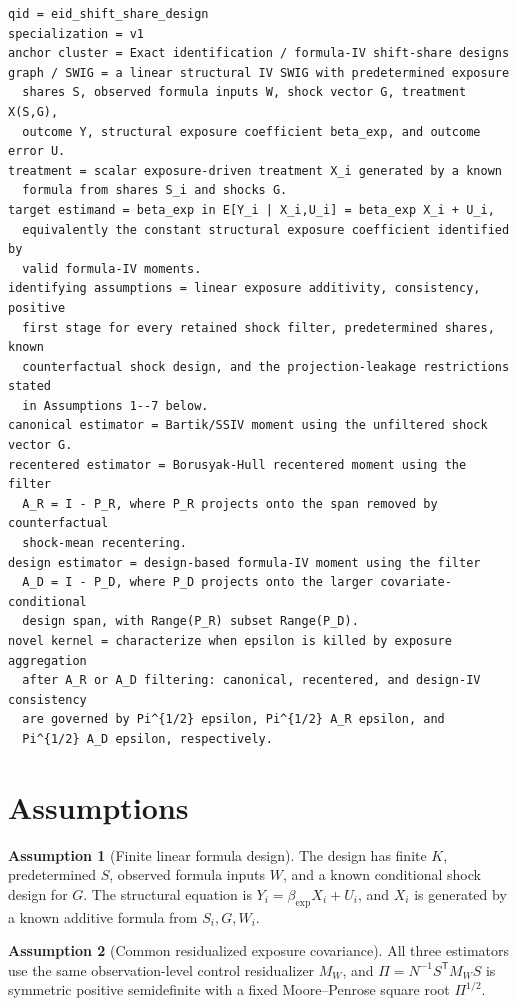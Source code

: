 \documentclass[11pt]{article}
\newcommand{\transpose}{\mathsf{T}}
\theoremstyle{definition}
\newtheorem{assumption}{Assumption}
\theoremstyle{plain}
\theoremstyle{remark}
\begin{document}
\begin{verbatim}
qid = eid_shift_share_design
specialization = v1
anchor cluster = Exact identification / formula-IV shift-share designs
graph / SWIG = a linear structural IV SWIG with predetermined exposure
  shares S, observed formula inputs W, shock vector G, treatment X(S,G),
  outcome Y, structural exposure coefficient beta_exp, and outcome error U.
treatment = scalar exposure-driven treatment X_i generated by a known
  formula from shares S_i and shocks G.
target estimand = beta_exp in E[Y_i | X_i,U_i] = beta_exp X_i + U_i,
  equivalently the constant structural exposure coefficient identified by
  valid formula-IV moments.
identifying assumptions = linear exposure additivity, consistency, positive
  first stage for every retained shock filter, predetermined shares, known
  counterfactual shock design, and the projection-leakage restrictions stated
  in Assumptions 1--7 below.
canonical estimator = Bartik/SSIV moment using the unfiltered shock vector G.
recentered estimator = Borusyak-Hull recentered moment using the filter
  A_R = I - P_R, where P_R projects onto the span removed by counterfactual
  shock-mean recentering.
design estimator = design-based formula-IV moment using the filter
  A_D = I - P_D, where P_D projects onto the larger covariate-conditional
  design span, with Range(P_R) subset Range(P_D).
novel kernel = characterize when epsilon is killed by exposure aggregation
  after A_R or A_D filtering: canonical, recentered, and design-IV consistency
  are governed by Pi^{1/2} epsilon, Pi^{1/2} A_R epsilon, and
  Pi^{1/2} A_D epsilon, respectively.
\end{verbatim}

\section{Assumptions}
\begin{assumption}[Finite linear formula design]\label{ass:finite-linear}
The design has finite \(K\), predetermined \(S\), observed formula inputs \(W\), and a known conditional shock design for \(G\).  The structural equation is \(Y_i=\beta_{\exp}X_i+U_i\), and \(X_i\) is generated by a known additive formula from \(S_i,G,W_i\).
\end{assumption}

\begin{assumption}[Common residualized exposure covariance]\label{ass:pi}
All three estimators use the same observation-level control residualizer \(M_W\), and \(\Pi=N^{-1}S^\transpose M_W S\) is symmetric positive semidefinite with a fixed Moore--Penrose square root \(\Pi^{1/2}\).
\end{assumption}
\end{document}

